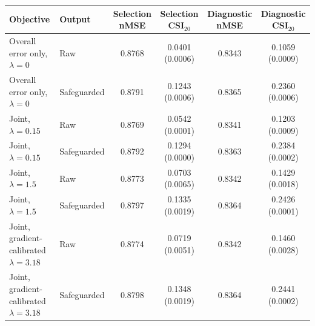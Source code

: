 \begin{tabular}{llcccc}
\hline
Objective & Output & Selection nMSE & Selection CSI$_{20}$ & Diagnostic nMSE & Diagnostic CSI$_{20}$ \\
\hline
Overall error only, $\lambda=0$ & Raw & 0.8768 & 0.0401 (0.0006) & 0.8343 & 0.1059 (0.0009) \\
Overall error only, $\lambda=0$ & Safeguarded & 0.8791 & 0.1243 (0.0006) & 0.8365 & 0.2360 (0.0006) \\
Joint, $\lambda=0.15$ & Raw & 0.8769 & 0.0542 (0.0001) & 0.8341 & 0.1203 (0.0009) \\
Joint, $\lambda=0.15$ & Safeguarded & 0.8792 & 0.1294 (0.0000) & 0.8363 & 0.2384 (0.0002) \\
Joint, $\lambda=1.5$ & Raw & 0.8773 & 0.0703 (0.0065) & 0.8342 & 0.1429 (0.0018) \\
Joint, $\lambda=1.5$ & Safeguarded & 0.8797 & 0.1335 (0.0019) & 0.8364 & 0.2426 (0.0001) \\
Joint, gradient-calibrated $\lambda=3.18$ & Raw & 0.8774 & 0.0719 (0.0051) & 0.8342 & 0.1460 (0.0028) \\
Joint, gradient-calibrated $\lambda=3.18$ & Safeguarded & 0.8798 & 0.1348 (0.0019) & 0.8364 & 0.2441 (0.0002) \\
\hline
\end{tabular}
